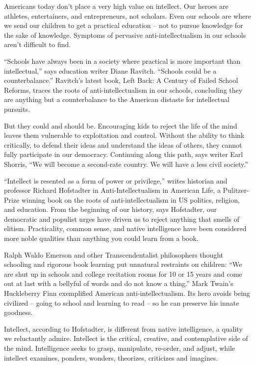 \documentclass[a4paper]{article}
\begin{document}
\par
Americans today don’t place a very high value on intellect. Our heroes are athletes, entertainers, and entrepreneurs, not scholars. Even our schools are where we send our children to get a practical education -- not to pursue knowledge for the sake of knowledge. Symptoms of pervasive anti-intellectualism in our schools aren’t difficult to find.

\par
“Schools have always been in a society where practical is more important than intellectual,” says education writer Diane Ravitch. “Schools could be a counterbalance.” Ravitch’s latest book, Left Back: A Century of Failed School Reforms, traces the roots of anti-intellectualism in our schools, concluding they are anything but a counterbalance to the American distaste for intellectual pursuits.

\par
But they could and should be. Encouraging kids to reject the life of the mind leaves them vulnerable to exploitation and control. Without the ability to think critically, to defend their ideas and understand the ideas of others, they cannot fully participate in our democracy. Continuing along this path, says writer Earl Shorris, “We will become a second-rate country. We will have a less civil society.”

\par
“Intellect is resented as a form of power or privilege,” writes historian and professor Richard Hofstadter in Anti-Intellectualism in American Life, a Pulitzer-Prize winning book on the roots of anti-intellectualism in US politics, religion, and education. From the beginning of our history, says Hofstadter, our democratic and populist urges have driven us to reject anything that smells of elitism. Practicality, common sense, and native intelligence have been considered more noble qualities than anything you could learn from a book.

\par
Ralph Waldo Emerson and other Transcendentalist philosophers thought schooling and rigorous book learning put unnatural restraints on children: “We are shut up in schools and college recitation rooms for 10 or 15 years and come out at last with a bellyful of words and do not know a thing.” Mark Twain’s Huckleberry Finn exemplified American anti-intellectualism. Its hero avoids being civilized -- going to school and learning to read -- so he can preserve his innate goodness.

\par
Intellect, according to Hofstadter, is different from native intelligence, a quality we reluctantly admire. Intellect is the critical, creative, and contemplative side of the mind. Intelligence seeks to grasp, manipulate, re-order, and adjust, while intellect examines, ponders, wonders, theorizes, criticizes and imagines.
\end{document}
